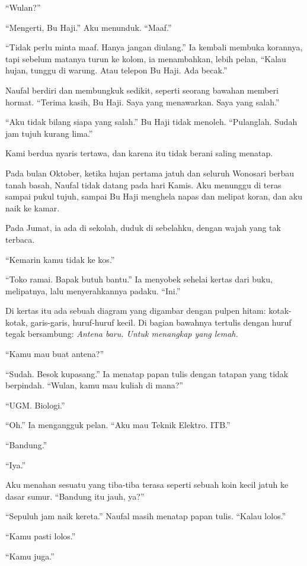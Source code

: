 \documentclass[11pt,twoside,openany]{book}
\makeatletter
\newcommand{\scenebreak}{\par\vspace{0.9em}{\centering\textsc{*\hspace{0.7em}*\hspace{0.7em}*}\par}\vspace{0.9em}\@afterindentfalse\@afterheading}
\makeatother
\begin{document}
``Wulan?''

``Mengerti, Bu Haji.'' Aku menunduk. ``Maaf.''

``Tidak perlu minta maaf. Hanya jangan diulang.'' Ia kembali membuka korannya, tapi sebelum matanya turun ke kolom, ia menambahkan, lebih pelan, ``Kalau hujan, tunggu di warung. Atau telepon Bu Haji. Ada becak.''

Naufal berdiri dan membungkuk sedikit, seperti seorang bawahan memberi hormat. ``Terima kasih, Bu Haji. Saya yang menawarkan. Saya yang salah.''

``Aku tidak bilang siapa yang salah.'' Bu Haji tidak menoleh. ``Pulanglah. Sudah jam tujuh kurang lima.''

Kami berdua nyaris tertawa, dan karena itu tidak berani saling menatap.

\scenebreak
Pada bulan Oktober, ketika hujan pertama jatuh dan seluruh Wonosari berbau tanah basah, Naufal tidak datang pada hari Kamis. Aku menunggu di teras sampai pukul tujuh, sampai Bu Haji menghela napas dan melipat koran, dan aku naik ke kamar.

Pada Jumat, ia ada di sekolah, duduk di sebelahku, dengan wajah yang tak terbaca.

``Kemarin kamu tidak ke kos.''

``Toko ramai. Bapak butuh bantu.'' Ia menyobek sehelai kertas dari buku, melipatnya, lalu menyerahkannya padaku. ``Ini.''

Di kertas itu ada sebuah diagram yang digambar dengan pulpen hitam: kotak-kotak, garis-garis, huruf-huruf kecil. Di bagian bawahnya tertulis dengan huruf tegak bersambung: \emph{Antena baru. Untuk menangkap yang lemah.}

``Kamu mau buat antena?''

``Sudah. Besok kupasang.'' Ia menatap papan tulis dengan tatapan yang tidak berpindah. ``Wulan, kamu mau kuliah di mana?''

``UGM. Biologi.''

``Oh.'' Ia mengangguk pelan. ``Aku mau Teknik Elektro. ITB.''

``Bandung.''

``Iya.''

Aku menahan sesuatu yang tiba-tiba terasa seperti sebuah koin kecil jatuh ke dasar sumur. ``Bandung itu jauh, ya?''

``Sepuluh jam naik kereta.'' Naufal masih menatap papan tulis. ``Kalau lolos.''

``Kamu pasti lolos.''

``Kamu juga.''
\end{document}
